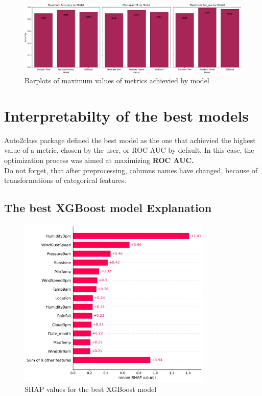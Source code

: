 \documentclass{article}%
\begin{document}
\begin{figure}[h!]%
\centering%
\includegraphics[width=460px]{ModelOptimization/barplots_max_metric.png}%
\caption{Barplots of maximum values of metrics achievied by model}%
\end{figure}

%
\newpage%
\section{Interpretabilty of the best models}%
\label{sec:Interpretabiltyofthebestmodels}%
Auto2class package defined the best model as the one that achievied the highest value of a metric, chosen by the user, or ROC AUC by default.%
In this case, the optimization process was aimed at maximizing%
\textbf{ ROC AUC.}%
\\%
Do not forget, that after preprocessing, columns names have changed, because of transformations of categorical features.%
\subsection{The best XGBoost model Explanation}%
\label{subsec:ThebestXGBoostmodelExplanation}%


\begin{figure}[h!]%
\centering%
\includegraphics[width=350px]{XAI/XGBoost/global_feature_importance_shap.png}%
\caption{SHAP values for the best XGBoost model}%
\end{figure}
\end{document}
